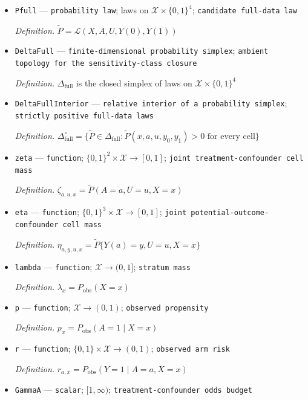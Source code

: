 \documentclass{article}
\begin{document}
\begin{itemize}
  \item \texttt{Pfull} --- \texttt{probability law}; laws on \(\mathcal X\times\{0,1\}^4\); \texttt{candidate full-\allowbreak{}data law}
  \par\smallskip\noindent\emph{Definition.} \(\widetilde P=\mathcal L(X,A,U,Y(0),Y(1))\)
  \item \texttt{DeltaFull} --- \texttt{finite-\allowbreak{}dimensional probability simplex}; \texttt{ambient topology for the sensitivity-\allowbreak{}class closure}
  \par\smallskip\noindent\emph{Definition.} \(\Delta_{\mathrm{full}}\) is the closed simplex of laws on \(\mathcal X\times\{0,1\}^4\)
  \item \texttt{DeltaFullInterior} --- \texttt{relative interior of a probability simplex}; \texttt{strictly positive full-\allowbreak{}data laws}
  \par\smallskip\noindent\emph{Definition.} \(\Delta_{\mathrm{full}}^{\circ}=\{\widetilde P\in\Delta_{\mathrm{full}}:\widetilde P(x,a,u,y_0,y_1)>0\text{ for every cell}\}\)
  \item \texttt{zeta} --- \texttt{function}; \(\{0,1\}^2\times\mathcal X\to[0,1]\); \texttt{joint treatment-\allowbreak{}confounder cell mass}
  \par\smallskip\noindent\emph{Definition.} \(\zeta_{a,u,x}=\widetilde P(A=a,U=u,X=x)\)
  \item \texttt{eta} --- \texttt{function}; \(\{0,1\}^3\times\mathcal X\to[0,1]\); \texttt{joint potential-\allowbreak{}outcome-\allowbreak{}confounder cell mass}
  \par\smallskip\noindent\emph{Definition.} \(\eta_{a,y,u,x}=\widetilde P\{Y(a)=y,U=u,X=x\}\)
  \item \texttt{lambda} --- \texttt{function}; \(\mathcal X\to(0,1]\); \texttt{stratum mass}
  \par\smallskip\noindent\emph{Definition.} \(\lambda_x=P_{\mathrm{obs}}(X=x)\)
  \item \texttt{p} --- \texttt{function}; \(\mathcal X\to(0,1)\); \texttt{observed propensity}
  \par\smallskip\noindent\emph{Definition.} \(p_x=P_{\mathrm{obs}}(A=1\mid X=x)\)
  \item \texttt{r} --- \texttt{function}; \(\{0,1\}\times\mathcal X\to(0,1)\); \texttt{observed arm risk}
  \par\smallskip\noindent\emph{Definition.} \(r_{a,x}=P_{\mathrm{obs}}(Y=1\mid A=a,X=x)\)
  \item \texttt{GammaA} --- \texttt{scalar}; \([1,\infty)\); \texttt{treatment-\allowbreak{}confounder odds budget}

\end{itemize}
\end{document}
